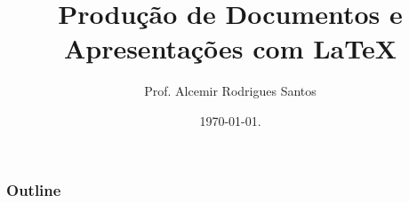 \documentclass[table,11pt]{beamer}
\title{Produção de Documentos e Apresentações com \LaTeX}
\author{Prof. Alcemir Rodrigues Santos}
\institute{\small Laboratório de Engenharia de Software\\[.25\baselineskip]
{\footnotesize Universidade Estadual do Piauí}}
\date{\today.}
\begin{document}
 
 
\begin{frame}[plain]    
  \titlepage  
\end{frame}   
    

\begin{frame}  
\frametitle{Outline} 
\tableofcontents
\end{frame} 





\end{document}
